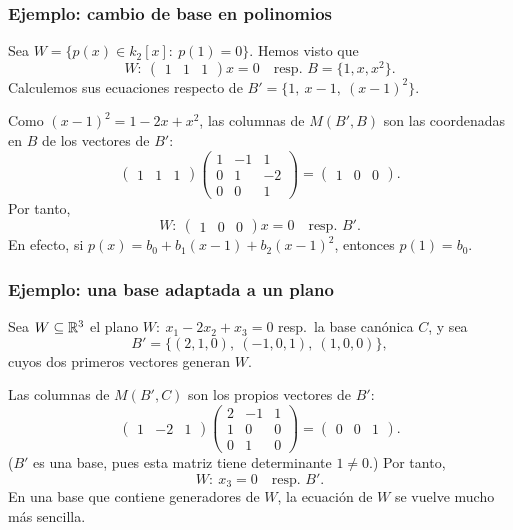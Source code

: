 \begin{frame}
    \frametitle{Ejemplo: cambio de base en polinomios}

    \begin{example}
        Sea $W=\{p(x)\in k_2[x]:\ p(1)=0\}$. Hemos visto que
        \[
            W\colon\ \begin{pmatrix}1&1&1\end{pmatrix}x=0
            \quad\text{resp.\ }B=\{1,x,x^2\}.
        \]
        Calculemos sus ecuaciones respecto de $B'=\{1,\ x-1,\ (x-1)^2\}$.
    \end{example}

    Como $(x-1)^2=1-2x+x^2$, las columnas de $M(B',B)$ son las coordenadas
    en $B$ de los vectores de $B'$:
    \[
        \begin{pmatrix}1&1&1\end{pmatrix}
        \begin{pmatrix}1&-1&1\\0&1&-2\\0&0&1\end{pmatrix}
        =\begin{pmatrix}1&0&0\end{pmatrix}.
    \]
    Por tanto,
    \[
        W\colon\ \begin{pmatrix}1&0&0\end{pmatrix}x=0
        \quad\text{resp.\ }B'.
    \]
    En efecto, si $p(x)=b_0+b_1(x-1)+b_2(x-1)^2$, entonces $p(1)=b_0$.
\end{frame}

\begin{frame}
    \frametitle{Ejemplo: una base adaptada a un plano}

    \begin{example}
        Sea $W\subseteq\mathbb{R}^3$ el plano $W\colon\ x_1-2x_2+x_3=0$ resp.\ la
        base canónica $C$, y sea
        \[
            B'=\{(2,1,0),\ (-1,0,1),\ (1,0,0)\},
        \]
        cuyos dos primeros vectores generan $W$.
    \end{example}

    Las columnas de $M(B',C)$ son los propios vectores de $B'$:
    \[
        \begin{pmatrix}1&-2&1\end{pmatrix}
        \begin{pmatrix}2&-1&1\\1&0&0\\0&1&0\end{pmatrix}
        =\begin{pmatrix}0&0&1\end{pmatrix}.
    \]
    ($B'$ es una base, pues esta matriz tiene determinante $1\neq0$.)
    Por tanto,
    \[
        W\colon\ x_3=0\quad\text{resp.\ }B'.
    \]
    En una base que contiene generadores de $W$, la ecuación de $W$ se
    vuelve \alert{mucho más sencilla}.
\end{frame}

